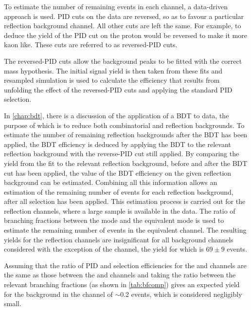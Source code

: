 To estimate the number of remaining events in each channel, a data-driven approach is used. PID cuts on the data are reversed, so as to favour a particular reflection background channel. All other cuts are left the same. For example, to deduce the yield of \Bd\to\Kp\pim\mup\mun the PID cut on the proton would be reversed to make it more kaon like. These cuts are referred to as reversed-PID cuts.

The reversed-PID cuts allow the background peaks to be fitted with the correct mass hypothesis. The initial signal yield is then taken from these fits and resampled simulation is used to calculate the efficiency that results from unfolding the effect of the reversed-PID cuts and applying the standard PID selection.

In \autoref{chap:bdt}, there is a discussion of the application of a BDT to data, the purpose of which is to reduce both combinatorial and reflection backgrounds. To estimate the number of remaining reflection backgrounds after the BDT has been applied, the BDT efficiency is deduced by applying the BDT to the relevant reflection background with the reverse-PID cut still applied. By comparing the yield from the fit to the relevant reflection background, before and after the BDT cut has been applied, the value of the BDT efficiency on the given reflection background can be estimated. Combining all this information allows an estimation of the remaining number of events for each reflection background, after all selection has been applied. This estimation process is carried out for the \jpsi reflection channels, where a large sample is available in the data. The ratio of branching fractions between the \jpsi mode and the equivalent \mumu mode is used to estimate the remaining number of events in the equivalent \mumu channel.
The resulting yields for the \jpsi reflection channels are insignificant for all background channels considered with the exception of the \BdToKpi\jpsi channel, the yield for which is $69\pm9$ events. %

Assuming that the ratio of PID and selection efficiencies for the \BdToKpi\jpsi and \Bd\to\Kp\pim\mup\mun channels are the same as those between the \Lbpijpsi and \Lbpi channels and taking the ratio between the relevant branching fractions (as shown in \autoref{tab:bfcomp}) gives an expected yield for the \BdToKpi\mumu background in the \Lbpi channel of $\sim$0.2 events, which is considered negligibly small. 

